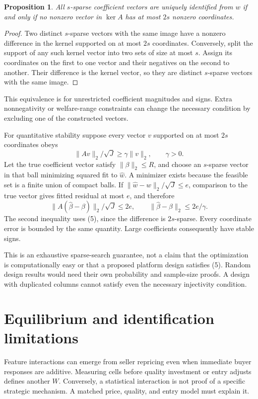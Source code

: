 \documentclass[11pt,a4paper]{article}
\newtheorem{proposition}[theorem]{Proposition}
\begin{document}
\begin{proposition}
All $s$-sparse coefficient vectors are uniquely identified from $w$ if and only if no nonzero vector in $\ker A$ has at most $2s$ nonzero coordinates.
\end{proposition}
\begin{proof}
Two distinct $s$-sparse vectors with the same image have a nonzero difference in the kernel supported on at most $2s$ coordinates. Conversely, split the support of any such kernel vector into two sets of size at most $s$. Assign its coordinates on the first to one vector and their negatives on the second to another. Their difference is the kernel vector, so they are distinct $s$-sparse vectors with the same image.
\end{proof}
This equivalence is for unrestricted coefficient magnitudes and signs. Extra nonnegativity or welfare-range constraints can change the necessary condition by excluding one of the constructed vectors.

For quantitative stability suppose every vector $v$ supported on at most $2s$ coordinates obeys
\[
 \|Av\|_2/\sqrt J\ge\gamma\|v\|_2,\qquad\gamma>0.
 \tag{5}
\]
Let the true coefficient vector satisfy $\|\beta\|_2\le R$, and choose an $s$-sparse vector in that ball minimizing squared fit to $\widehat w$. A minimizer exists because the feasible set is a finite union of compact balls. If $\|\widehat w-w\|_2/\sqrt J\le e$, comparison to the true vector gives fitted residual at most $e$, and therefore
\[
 \|A(\widehat\beta-\beta)\|_2/\sqrt J\le2e,\qquad
 \|\widehat\beta-\beta\|_2\le2e/\gamma.
 \tag{6}
\]
The second inequality uses (5), since the difference is $2s$-sparse. Every coordinate error is bounded by the same quantity. Large coefficients consequently have stable signs.

This is an exhaustive sparse-search guarantee, not a claim that the optimization is computationally easy or that a proposed platform design satisfies (5). Random design results would need their own probability and sample-size proofs. A design with duplicated columns cannot satisfy even the necessary injectivity condition.
\section{Equilibrium and identification limitations}
Feature interactions can emerge from seller repricing even when immediate buyer responses are additive. Measuring cells before quality investment or entry adjusts defines another $W$. Conversely, a statistical interaction is not proof of a specific strategic mechanism. A matched price, quality, and entry model must explain it.
\end{document}
